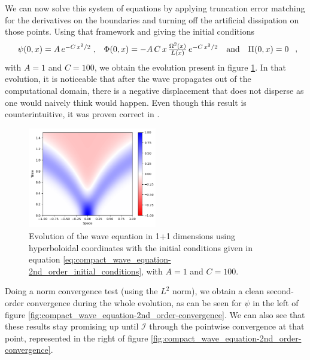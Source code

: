 We can now solve this system of equations by applying truncation error matching for the derivatives on the boundaries and turning off the artificial dissipation on those points. Using that framework and giving the initial conditions
\begin{equation}
    \begin{array}{c c c c}
        \psi(0,x) = A \, e^{-C \, x^2/2} \; , & \Phi(0,x) = - A \,C \, x \, \frac{\Omega^2(x)}{L(x)} \, e^{-C \, x^2/2} & \text{and} & \Pi(0,x) = 0
    \end{array} \; ,
    \label{eq:compact_wave_equation-2nd_order_initial_conditions}
\end{equation}
with $A = 1$ and $C = 100$, we obtain the evolution present in figure \ref{fig:compact_wave_equation-2nd_order}. In that evolution, it is noticeable that after the wave propagates out of the computational domain, there is a negative displacement that does not disperse as one would naively think would happen. Even though this result is counterintuitive, it was proven correct in \cite{}.

\begin{figure}[h]
    \centering
    \includegraphics[width=0.5\textwidth]{Images/Wave_Equation_1+1-Solution.png}
    \caption{Evolution of the wave equation in 1+1 dimensions using hyperboloidal coordinates with the initial conditions given in equation \eqref{eq:compact_wave_equation-2nd_order_initial_conditions}, with $A = 1$ and $C = 100$.}
    \label{fig:compact_wave_equation-2nd_order}
\end{figure}

Doing a norm convergence test (using the $L^2$ norm), we obtain a clean second-order convergence during the whole evolution, as can be seen for $\psi$ in the left of figure \ref{fig:compact_wave_equation-2nd_order-convergence}. We can also see that these results stay promising up until $\mathscr{I}$ through the pointwise convergence at that point, represented in the right of figure \ref{fig:compact_wave_equation-2nd_order-convergence}.

